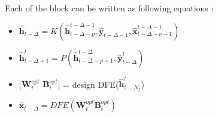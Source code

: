 Each of the block can be written as following equations : \\
\begin{itemize}
\item $\hat{\boldsymbol{h}} _{t-\Delta} = K(\hat{\boldsymbol{h}} _{t-\Delta-p} ^{t-\Delta-1},\hat{\boldsymbol{y}} _{t-\Delta-1},\hat{\boldsymbol{x}} _{t-\Delta-\nu-1} ^{t-\Delta-1})$
\item $\hat{\boldsymbol{h}} _{t-\Delta+1} ^t = P(\hat{\boldsymbol{h}} _{t-\Delta-p+1} ^{t-\Delta},\hat{\boldsymbol{y}} _{t-\Delta} ^t)$

\item $[{\boldsymbol{W}} _{t} ^{opt}$ ${\boldsymbol{B}} _{t} ^{opt}]$  = design DFE($\hat{\boldsymbol{h}} _{t-N_f} ^{t}$)

\item $ \hat{\boldsymbol{x}} _{t-\Delta} = DFE({\boldsymbol{W}} _{t} ^{opt} {\boldsymbol{B}} _{t} ^{opt} )$
\end{itemize} 
